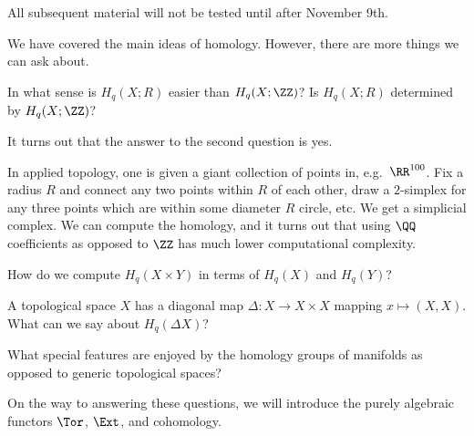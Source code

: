 \documentclass{standalone}
\begin{document}
\begin{note}
  All subsequent material will not be tested until after November 9th.
\end{note}

We have covered the main ideas of homology.
However, there are more things we can ask about.
\begin{question}
  In what sense is \(H_q(X; R)\) easier than \(H_q(X; \ZZ)\)?
  Is \(H_q(X; R)\) determined by \(H_q(X; \ZZ)\)?
\end{question}
It turns out that the answer to the second question is yes.

\begin{note}
  In applied topology, one is given a giant collection of points in,
  e.g.\ \(\RR^{100}\).
  Fix a radius \(R\) and connect any two points within \(R\) of each other,
  draw a \(2\)-simplex for any three points which are
    within some diameter \(R\) circle, etc.
  We get a simplicial complex.
  We can compute the homology, and it turns out that using \(\QQ\) coefficients
  as opposed to \(\ZZ\) has much lower computational complexity.
\end{note}

\begin{question}
  How do we compute \(H_q(X \times Y)\) in terms of \(H_q(X)\) and \(H_q(Y)\)?
\end{question}

\begin{question}
  A topological space \(X\) has a diagonal map
  \(\Delta \colon X \to X \times X\) mapping \(x \mapsto (X, X)\).
  What can we say about \(H_q(\Delta X)\)?
\end{question}

\begin{question}
  What special features are enjoyed by the homology groups of manifolds
  as opposed to generic topological spaces?
\end{question}

On the way to answering these questions,
we will introduce the purely algebraic functors \(\Tor\), \(\Ext\),
and cohomology.
\end{document}
